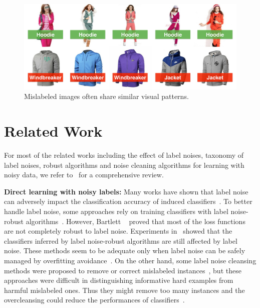 \documentclass[10pt,twocolumn,letterpaper]{article}
\begin{document}
\begin{figure}[t]
\begin{center}
\includegraphics[width=1.0\linewidth]{figure/noise_cluster.pdf}
\end{center}
\caption{Mislabeled images often share similar visual patterns.}
\label{fig:noise_cluster}
\end{figure}

\section{Related Work} %
\label{sec:related_work}
For most of the related works including the effect of label noises, taxonomy of label noises, robust algorithms and noise cleaning algorithms for learning with noisy data, we refer to~\cite{frenay2014classification} for a comprehensive review. 

{\bf Direct learning with noisy labels:} Many works have shown that label noise can adversely impact the classification accuracy of induced classifiers~\cite{zhu2004class}. To better handle label noise, some approaches rely on training classifiers with label noise-robust algorithms~\cite{beigman2009learning,manwani2013noise}. However, Bartlett \etal~\cite{bartlett2006convexity} proved that most of the loss functions are not completely robust to label noise. Experiments in~\cite{teng2001comparison} showed that the classifiers inferred by label noise-robust algorithms are still affected by label noise. These methods seem to be adequate only when label noise can be safely managed by overfitting avoidance~\cite{frenay2014classification}. On the other hand, some label noise cleansing methods were proposed to remove or correct mislabeled instances~\cite{barandela2000decontamination,brodley2011identifying,miranda2009use}, but these approaches were difficult in distinguishing informative hard examples from harmful mislabeled ones. Thus they might remove too many instances and the overcleansing could reduce the performances of classifiers~\cite{matic1992computer}.
\end{document}
